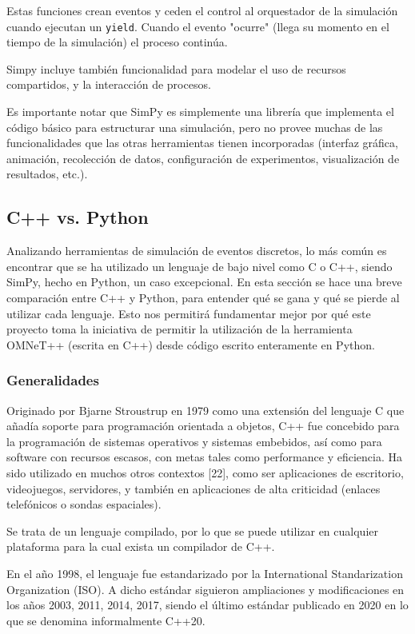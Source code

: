 \documentclass[]{article}
\begin{document}
Estas funciones crean eventos y ceden el control al orquestador de la
simulación cuando ejecutan un \verb!yield!. Cuando el evento "ocurre" (llega su
momento en el tiempo de la simulación) el proceso continúa.

Simpy incluye también funcionalidad para modelar el uso de recursos
compartidos, y la interacción de procesos.

Es importante notar que SimPy es simplemente una librería que implementa el
código básico para estructurar una simulación, pero no provee muchas de las
funcionalidades que las otras herramientas tienen incorporadas (interfaz
gráfica, animación, recolección de datos, configuración de experimentos,
visualización de resultados, etc.).

\subsection{C++ vs. Python}

Analizando herramientas de simulación de eventos discretos, lo más común es
encontrar que se ha utilizado un lenguaje de bajo nivel como C o C++, siendo
SimPy, hecho en Python, un caso excepcional. En esta sección se hace una breve
comparación entre C++ y Python, para entender qué se gana y qué se pierde al
utilizar cada lenguaje. Esto nos permitirá fundamentar mejor por qué este
proyecto toma la iniciativa de permitir la utilización de la herramienta
OMNeT++ (escrita en C++) desde código escrito enteramente en Python.

\subsubsection{Generalidades}

Originado por Bjarne Stroustrup en 1979 como una extensión del lenguaje C que
añadía soporte para programación orientada a objetos, C++ fue concebido para la
programación de sistemas operativos y sistemas embebidos, así como para
software con recursos escasos, con metas tales como performance y eficiencia.
Ha sido utilizado en muchos otros contextos [22], como ser aplicaciones de
escritorio, videojuegos, servidores, y también en aplicaciones de alta
criticidad (enlaces telefónicos o sondas espaciales).

Se trata de un lenguaje compilado, por lo que se puede utilizar en cualquier
plataforma para la cual exista un compilador de C++.

En el año 1998, el lenguaje fue estandarizado por la International
Standarization Organization (ISO). A dicho estándar siguieron ampliaciones y
modificaciones en los años 2003, 2011, 2014, 2017, siendo el último estándar
publicado en 2020 en lo que se denomina informalmente C++20.
\end{document}
